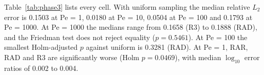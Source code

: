 Table~\ref{tab:phase3} lists every cell. With uniform sampling the median relative $L_2$ error is 0.1503 at
Pe = 1, 0.0180 at Pe = 10, 0.0504 at Pe = 100 and 0.1793 at Pe = 1000. At Pe = 1000 the medians range from 0.1658
(R3) to 0.1888 (RAD), and the Friedman test does not reject equality ($p = 0.5461$). At Pe = 100 the smallest
Holm-adjusted $p$ against uniform is 0.3281 (RAD). At Pe = 1, RAR, RAD and R3 are significantly worse
(Holm $p = 0.0469$), with median $\log_{10}$ error ratios of 0.002 to 0.004.
